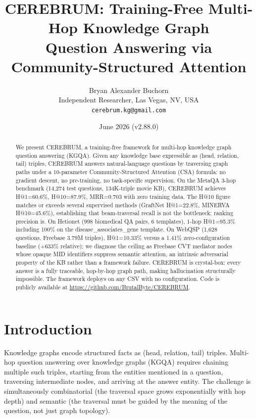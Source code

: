 \documentclass[11pt,a4paper]{article}
\title{\textbf{CEREBRUM: Training-Free Multi-Hop Knowledge Graph\\
Question Answering via Community-Structured Attention}}
\author{
  Bryan Alexander Buchorn \\
  Independent Researcher, Las Vegas, NV, USA \\
  \texttt{cerebrum.kg@gmail.com}
}
\date{June 2026 \quad (v2.88.0)}
\begin{document}
\maketitle

\begin{abstract}
We present CEREBRUM, a training-free framework for multi-hop knowledge graph
question answering (KGQA). Given any knowledge base expressible as
(head, relation, tail) triples, CEREBRUM answers natural-language questions by
traversing graph paths under a 10-parameter Community-Structured Attention (CSA)
formula: no gradient descent, no pre-training, no task-specific supervision.
On the MetaQA 3-hop benchmark (14,274 test questions, 134K-triple movie KB),
CEREBRUM achieves H@1=60.6\%, H@10=87.9\%, MRR=0.703 with zero training data.
The H@10 figure matches or exceeds several supervised methods
(GraftNet H@1=22.8\%, MINERVA H@10=45.6\%), establishing that beam-traversal
recall is not the bottleneck; ranking precision is.
On Hetionet (998 biomedical QA pairs, 6 templates), 1-hop H@1=95.3\%
including 100\% on the disease\_associates\_gene template.
On WebQSP (1,628 questions, Freebase 3.79M triples), H@1=10.33\% versus a
1.41\% zero-configuration baseline (+633\% relative); we diagnose the ceiling
as Freebase CVT mediator nodes whose opaque MID identifiers suppress semantic
attention, an intrinsic adversarial property of the KB rather than a framework
failure. CEREBRUM is crystal-box: every answer is a fully traceable, hop-by-hop
graph path, making hallucination structurally impossible. The framework deploys
on any CSV with no configuration. Code is publicly available at
\url{https://github.com/BrutalByte/CEREBRUM}.
\end{abstract}

\section{Introduction}

Knowledge graphs encode structured facts as (head, relation, tail) triples.
Multi-hop question answering over knowledge graphs (KGQA) requires chaining
multiple such triples, starting from the entities mentioned in a question,
traversing intermediate nodes, and arriving at the answer entity. The challenge
is simultaneously combinatorial (the traversal space grows exponentially with
hop depth) and semantic (the traversal must be guided by the meaning of the
question, not just graph topology).
\end{document}
